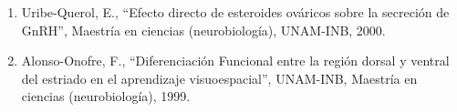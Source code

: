 \begin{enumerate}
\item Uribe-Querol, E., “Efecto directo de esteroides ováricos sobre la secreción de GnRH”, Maestría en ciencias (neurobiología), UNAM-INB, 2000.

\item Alonso-Onofre, F., “Diferenciación Funcional entre la región dorsal y ventral del estriado en el aprendizaje visuoespacial”, UNAM-INB, Maestría en 
ciencias 
(neurobiología), 1999.

\end{enumerate}



